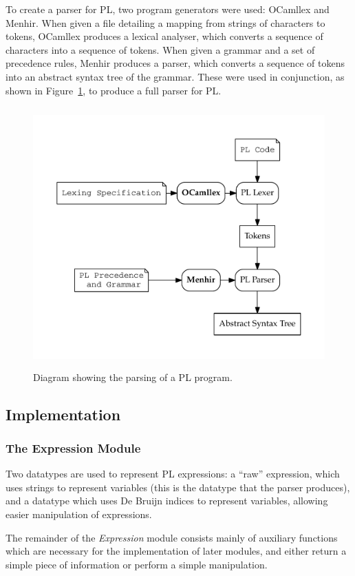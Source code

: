 \documentclass[12pt,a4paper,twoside,openany]{report}
\begin{document}
To create a parser for PL, two program generators were used:
OCamllex and Menhir. When given a
file detailing a mapping from strings of characters to tokens,
OCamllex produces a lexical analyser, which converts a sequence
of characters into a sequence of tokens. When given a
grammar and a set of precedence rules, Menhir produces a parser,
which converts a sequence of tokens into an abstract syntax tree
of the grammar. These were used in conjunction, as shown in
Figure~\ref{fig:parsing}, to produce a full parser for PL.

\begin{figure}
	\centering
	\includegraphics[height=10cm]{parsing}
	\caption{Diagram showing the parsing of
		a PL program.}
	\label{fig:parsing}
\end{figure}

\subsection{Implementation}

\subsubsection{The Expression Module}
Two datatypes are used to
represent PL expressions: a ``raw'' expression, which
uses strings to represent variables (this is the
datatype that the parser produces), and a datatype
which uses De Bruijn indices \cite{debr72} to
represent variables, allowing
easier manipulation of expressions.

The remainder of the \emph{Expression} module
consists mainly of auxiliary functions which are
necessary for the implementation of later
modules, and either return a simple piece
of information or perform a simple manipulation.
\end{document}
